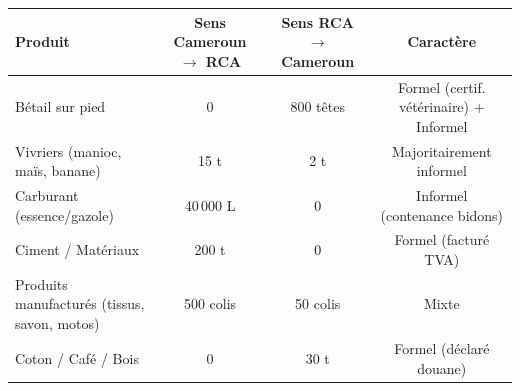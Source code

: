 \documentclass[11pt]{article}
\begin{document}
\begin{center}
\begin{tabular}{|l|c|c|c|}\hline
\rowcolor{popblueL}
\textbf{Produit} & \textbf{Sens Cameroun $\to$ RCA} & \textbf{Sens RCA $\to$ Cameroun} & \textbf{Caractère} \\ \hline
Bétail sur pied & 0 & 800 têtes & Formel (certif. vétérinaire) + Informel \\ \hline
Vivriers (manioc, maïs, banane) & 15 t & 2 t & Majoritairement informel \\ \hline
Carburant (essence/gazole) & 40\,000 L & 0 & Informel (contenance bidons) \\ \hline
Ciment / Matériaux & 200 t & 0 & Formel (facturé TVA) \\ \hline
Produits manufacturés (tissus, savon, motos) & 500 colis & 50 colis & Mixte \\ \hline
Coton / Café / Bois & 0 & 30 t & Formel (déclaré douane) \\ \hline
\end{tabular}
\end{center}
\end{document}
